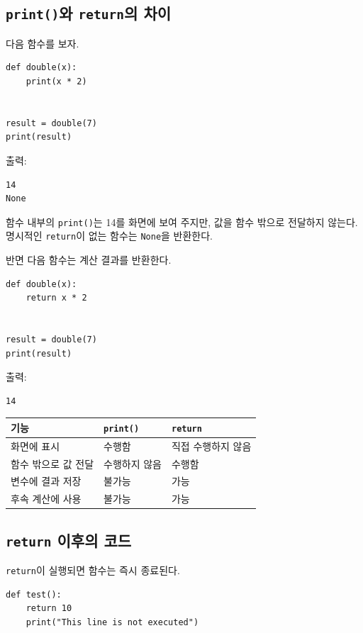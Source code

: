 \documentclass[11pt,a4paper]{article}
\begin{document}
\subsection{\texttt{print()}와 \texttt{return}의 차이}

다음 함수를 보자.

\begin{lstlisting}
def double(x):
    print(x * 2)


result = double(7)
print(result)
\end{lstlisting}

출력:

\begin{verbatim}
14
None
\end{verbatim}

함수 내부의 \texttt{print()}는 14를 화면에 보여 주지만, 값을 함수 밖으로 전달하지 않는다. 명시적인 \texttt{return}이 없는 함수는 \texttt{None}을 반환한다.

반면 다음 함수는 계산 결과를 반환한다.

\begin{lstlisting}
def double(x):
    return x * 2


result = double(7)
print(result)
\end{lstlisting}

출력:

\begin{verbatim}
14
\end{verbatim}

\begin{center}
\begin{tabular}{lll}
\toprule
기능 & \texttt{print()} & \texttt{return} \\
\midrule
화면에 표시 & 수행함 & 직접 수행하지 않음 \\
함수 밖으로 값 전달 & 수행하지 않음 & 수행함 \\
변수에 결과 저장 & 불가능 & 가능 \\
후속 계산에 사용 & 불가능 & 가능 \\
\bottomrule
\end{tabular}
\end{center}

\subsection{\texttt{return} 이후의 코드}

\texttt{return}이 실행되면 함수는 즉시 종료된다.

\begin{lstlisting}
def test():
    return 10
    print("This line is not executed")
\end{lstlisting}
\end{document}
